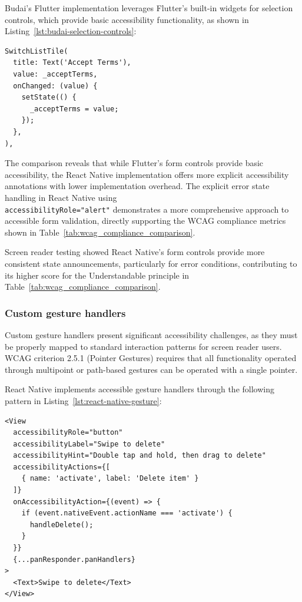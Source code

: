Budai's Flutter implementation leverages Flutter's built-in widgets for selection controls, which provide basic accessibility functionality, as shown in Listing~\ref{lst:budai-selection-controls}:

\begin{lstlisting}[style=DartStyle, caption=Selection controls in Budai's Flutter code, label=lst:budai-selection-controls]
SwitchListTile(
  title: Text('Accept Terms'),
  value: _acceptTerms,
  onChanged: (value) {
    setState(() {
      _acceptTerms = value;
    });
  },
),
\end{lstlisting}

\pagebreak

The comparison reveals that while Flutter's form controls provide basic accessibility, the React Native implementation offers more explicit accessibility annotations with lower implementation overhead. The explicit error state handling in React Native using \\ \texttt{accessibilityRole="alert"} demonstrates a more comprehensive approach to accessible form validation, directly supporting the WCAG compliance metrics shown in Table~\ref{tab:wcag_compliance_comparison}.

Screen reader testing showed React Native's form controls provide more consistent state announcements, particularly for error conditions, contributing to its higher score for the Understandable principle in Table~\ref{tab:wcag_compliance_comparison}.

\subsubsection{Custom gesture handlers}
\label{subsubsec:gesture-handlers}

Custom gesture handlers present significant accessibility challenges, as they must be properly mapped to standard interaction patterns for screen reader users. WCAG criterion 2.5.1 (Pointer Gestures) requires that all functionality operated through multipoint or path-based gestures can be operated with a single pointer.

React Native implements accessible gesture handlers through the following pattern in Listing~\ref{lst:react-native-gesture}:

\begin{lstlisting}[style=ReactNativeStyle, caption=Accessible gesture handler in React Native, label=lst:react-native-gesture]
<View
  accessibilityRole="button"
  accessibilityLabel="Swipe to delete"
  accessibilityHint="Double tap and hold, then drag to delete"
  accessibilityActions={[
    { name: 'activate', label: 'Delete item' }
  ]}
  onAccessibilityAction={(event) => {
    if (event.nativeEvent.actionName === 'activate') {
      handleDelete();
    }
  }}
  {...panResponder.panHandlers}
>
  <Text>Swipe to delete</Text>
</View>
\end{lstlisting}

